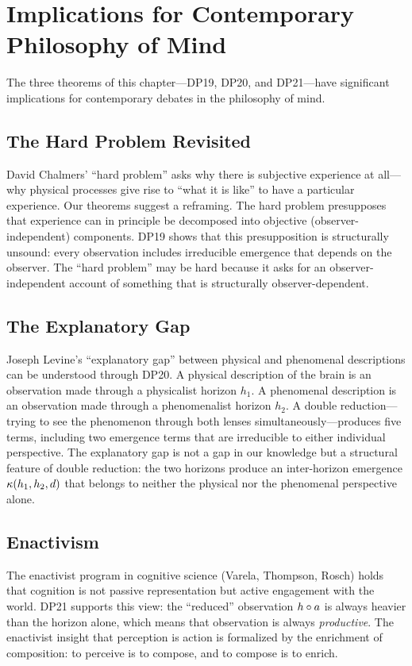 \section{Implications for Contemporary Philosophy of Mind}

The three theorems of this chapter---DP19, DP20, and DP21---have
significant implications for contemporary debates in the philosophy of
mind.

\subsection{The Hard Problem Revisited}

David Chalmers' ``hard problem'' asks why there is subjective experience
at all---why physical processes give rise to ``what it is like'' to have
a particular experience. Our theorems suggest a reframing. The hard
problem presupposes that experience can in principle be decomposed into
objective (observer-independent) components. DP19 shows that this
presupposition is structurally unsound: every observation includes
irreducible emergence that depends on the observer. The ``hard problem''
may be hard because it asks for an observer-independent account of
something that is structurally observer-dependent.

\subsection{The Explanatory Gap}

Joseph Levine's ``explanatory gap'' between physical and phenomenal
descriptions can be understood through DP20. A physical description of
the brain is an observation made through a physicalist horizon $h_1$.
A phenomenal description is an observation made through a phenomenalist
horizon $h_2$. A double reduction---trying to see the phenomenon
through both lenses simultaneously---produces five terms, including
two emergence terms that are irreducible to either individual
perspective. The explanatory gap is not a gap in our knowledge but a
structural feature of double reduction: the two horizons produce an
inter-horizon emergence $\kappa(h_1, h_2, d)$ that belongs to
neither the physical nor the phenomenal perspective alone.

\subsection{Enactivism}

The enactivist program in cognitive science (Varela, Thompson, Rosch)
holds that cognition is not passive representation but active engagement
with the world. DP21 supports this view: the ``reduced'' observation
$h \circ a$ is always heavier than the horizon alone, which means
that observation is always \emph{productive}. The enactivist insight
that perception is action is formalized by the enrichment of
composition: to perceive is to compose, and to compose is to enrich.

